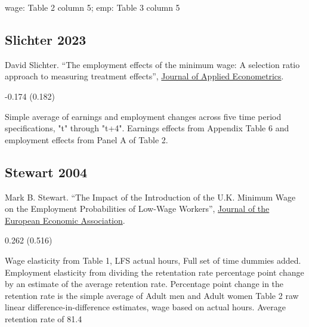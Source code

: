 \vspace{0.7em}

 wage: Table 2 column 5; emp: Table 3 column 5

\subsection*{Slichter 2023}
\vspace{-0.7em}

\noindent David Slichter. ``The employment effects of the minimum wage: A selection ratio approach to measuring treatment effects'', \href{https://doi.org/10.1002/jae.2954}{Journal of Applied Econometrics}.

\vspace{0.7em}

 -0.174 (0.182)

\vspace{0.7em}

 Simple average of earnings and employment changes across five time period specifications, "t" through "t+4". Earnings effects from Appendix Table 6 and employment effects from Panel A of Table 2.

\subsection*{Stewart 2004}
\vspace{-0.7em}

\noindent Mark B. Stewart. ``The Impact of the Introduction of the U.K. Minimum Wage on the Employment Probabilities of Low-Wage Workers'', \href{https://doi.org/10.1162/154247604323015481}{Journal of the European Economic Association}.

\vspace{0.7em}

 0.262 (0.516)

\vspace{0.7em}

 Wage elasticity from Table 1, LFS actual hours, Full set of time dummies added. Employment elasticity from dividing the retentation rate percentage point change by an estimate of the average retention rate. Percentage point change in the retention rate is the simple average of Adult men and Adult women Table 2 raw linear difference-in-difference estimates, wage based on actual hours. Average retention rate of 81.4%

